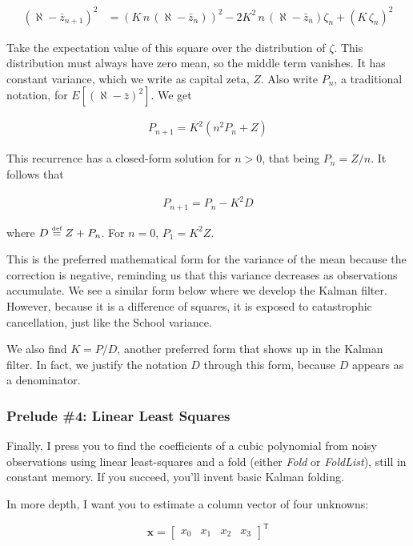 \documentclass[10pt,oneside,x11names]{article}
\begin{document}
\begin{enumerate}
\begin{align}
(\aleph-\bar{z}_{n+1})^2
&=
\left(
K\, n\, (\aleph - \bar{z}_n)
\right)^2-
2K^2\,n\,(\aleph - \bar{z}_n)\zeta_n+ (K\,\zeta_n)^2
\end{align}

\noindent Take the expectation value of this square over the distribution of
\(\zeta\). This distribution must always have zero mean, so the middle term
vanishes. It has constant variance, which we write as capital zeta, \(Z\). Also
write \(P_n\), a traditional notation, for \(E\left[(\aleph-\bar{z})^2\right]\). We
get

\begin{align}
P_{n+1}=K^2(n^2P_n+Z)
\end{align}

\noindent This recurrence has a closed-form solution for \(n>0\), that being
\(P_n=Z/n\). It follows that

\begin{align}
P_{n+1}=P_n-K^2D
\end{align}

where \(D\stackrel{\text{\tiny def}}{=}Z+P_n\). For \(n=0\), \(P_1=K^2Z\).

This is the preferred mathematical form for the variance of the mean because the
correction is negative, reminding us that this variance decreases as
observations accumulate. We see a similar form below where we develop the Kalman
filter. However, because it is a difference of squares, it is exposed to
catastrophic cancellation, just like the School variance.

We also find \(K=P/D\), another preferred form that shows up in the
Kalman filter. In fact, we justify the notation \(D\) through this form, because
\(D\) appears as a denominator.
\end{enumerate}

\subsubsection{Prelude \#4: Linear Least Squares}
\label{sec:orgheadline16}

Finally, I press you to find the coefficients of a cubic polynomial from
noisy observations using linear least-squares and a fold (either \emph{Fold} or
\emph{FoldList}), still in constant memory. If you succeed, you'll invent basic
Kalman folding.

In more depth, I want you to estimate a column vector of four unknowns:

\begin{equation}
\mathbold{x} =
\begin{bmatrix}
 x_0 &
 x_1 &
 x_2 &
 x_3
\end{bmatrix} ^ {\mathsf{T}}
\end{equation}
\end{document}
